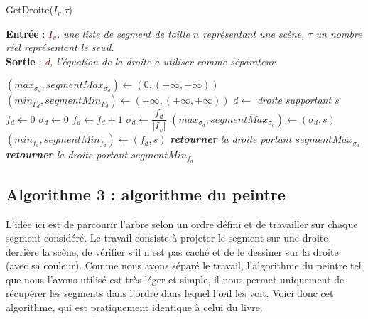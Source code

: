 \documentclass{article}
\newcommand{\red}[1]{\textcolor{darkred}{#1}}
\begin{document}
\begin{algorithm}
\caption{GetDroite($I_v$,$\tau$)}
\textbf{Entrée} : \textit{\red{$I_v$}, une liste de segment de taille $n$ représentant une scène, 
\red{$\tau$} un nombre réel représentant le seuil.} \\
\textbf{Sortie} : \textit{\red{d}, l'équation de la droite à utiliser comme séparateur.}
\begin{algorithmic}
\STATE $(max_{\sigma_d}, segmentMax_{\sigma_d}) \leftarrow (0,(+\infty,+\infty))$
\STATE $(min_{F_d}, segmentMin_{F_d}) \leftarrow (+\infty,(+\infty,+\infty))$
	\STATE $d \leftarrow$ \textit{droite supportant s}
	\STATE $f_d \leftarrow 0$
	\STATE $\sigma_d \leftarrow 0$
			\STATE $f_d \leftarrow f_d + 1$
		\ENDIF
	\ENDFOR
	\STATE $\sigma_d \leftarrow \dfrac{f_d}{|I_v|}$
		\STATE $(max_{\sigma_d}, segmentMax_{\sigma_d}) \leftarrow (\sigma_d,s)$
	\ENDIF
		\STATE $(min_{f_d}, segmentMin_{f_d}) \leftarrow (f_d,s)$
	\ENDIF
\ENDFOR
\IF{$\sigma_d \geq \red{\tau}$} 
	\STATE \textit{\textbf{retourner} la droite portant $segmentMax_{\sigma_d}$}
\ELSE
	\STATE \textit{\textbf{retourner} la droite portant $segmentMin_{f_d}$}
\ENDIF
\end{algorithmic}
\end{algorithm}

\subsection{Algorithme 3 : algorithme du peintre}

L'idée ici est de parcourir l'arbre selon un ordre défini et de travailler sur chaque segment 
considéré. Le travail consiste à projeter le segment sur une droite derrière la scène, de vérifier 
s'il n'est pas caché et de le dessiner sur la droite (avec sa couleur). Comme nous avons séparé le 
travail, l'algorithme du peintre tel que nous l'avons utilisé est très léger et simple, il nous 
permet uniquement de récupérer les segments dans l'ordre dans lequel l'\oe il les voit. Voici donc 
cet algorithme, qui est pratiquement identique à celui du livre.
\end{document}
